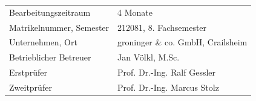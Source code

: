 \begin{titlepage}
\begin{singlespace}
\fontsize{13}{18} \selectfont
\begin{tabular}{ l  l }
  Bearbeitungszeitraum & \hspace{0.85cm} 4 Monate \\
  Matrikelnummer, Semester & \hspace{0.85cm} 212081, 8. Fachsemester \\
  Unternehmen, Ort & \hspace{0.85cm} groninger \& co. GmbH, Crailsheim \\
  Betrieblicher Betreuer & \hspace{0.85cm} Jan Völkl, M.Sc. \\
  Erstprüfer & \hspace{0.85cm} Prof. Dr.-Ing. Ralf Gessler \\
  Zweitprüfer & \hspace{0.85cm} Prof. Dr.-Ing. Marcus Stolz \\
\end{tabular}

\newpage



\setcounter{page}{2}

\renewcommand{\contentsname}{Inhaltsverzeichnis}

\fontsize{11}{18} \selectfont

\end{singlespace}
\end{titlepage}